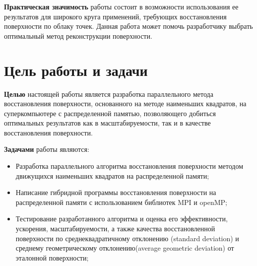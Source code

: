 


\textbf{Практическая значимость} работы состоит в возможности использования ее результатов для широкого круга применений, требующих восстановления поверхности по облаку точек. Данная работа может помочь разработчику выбрать оптимальный метод реконструкции поверхности.

\section*{Цель работы и задачи}
\textbf{Целью} настоящей работы является разработка параллельного метода восстановления поверхности, основанного на методе наименьших квадратов, на суперкомпьютере с распределенной памятью, позволяющего добиться оптимальных результатов как в масштабируемости, так и в качестве восстановления поверхности.

\textbf{Задачами} работы являются: 
\begin{itemize}
    \item Разработка параллельного алгоритма восстановления поверхности методом движущихся наименьших квадратов на распределенной памяти;
    \item Написание гибридной программы восстановления поверхности на распределенной памяти с использованием библиотек MPI и openMP;
    \item Тестирование разработанного алгоритма и оценка его эффективности, ускорения, масштабируемости, а также качества восстановленной поверхности по среднеквадратичному отклонению (standard deviation) и среднему геометрическому отклонению(average geometric deviation) от эталонной поверхности;
\end{itemize}
